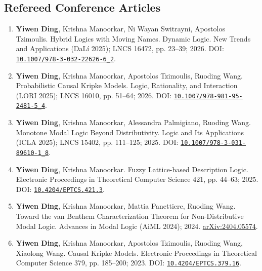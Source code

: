 \documentclass[11pt,a4paper]{article}
\begin{document}
\subsection*{Refereed Conference Articles}
\begin{enumerate}
\item \textbf{Yiwen Ding}, Krishna Manoorkar, Ni Wayan Switrayni, Apostolos Tzimoulis. Hybrid Logics with Moving Names. \textnormal{Dynamic Logic. New Trends and Applications (DaL\'{i} 2025); LNCS 16472, pp. 23--39; 2026}. DOI: \href{https://doi.org/10.1007/978-3-032-22626-6_2}{\nolinkurl{10.1007/978-3-032-22626-6_2}}.
\item \textbf{Yiwen Ding}, Krishna Manoorkar, Apostolos Tzimoulis, Ruoding Wang. Probabilistic Causal Kripke Models. \textnormal{Logic, Rationality, and Interaction (LORI 2025); LNCS 16010, pp. 51--64; 2026}. DOI: \href{https://doi.org/10.1007/978-981-95-2481-5_4}{\nolinkurl{10.1007/978-981-95-2481-5_4}}.
\item \textbf{Yiwen Ding}, Krishna Manoorkar, Alessandra Palmigiano, Ruoding Wang. Monotone Modal Logic Beyond Distributivity. \textnormal{Logic and Its Applications (ICLA 2025); LNCS 15402, pp. 111--125; 2025}. DOI: \href{https://doi.org/10.1007/978-3-031-89610-1_8}{\nolinkurl{10.1007/978-3-031-89610-1_8}}.
\item \textbf{Yiwen Ding}, Krishna Manoorkar. Fuzzy Lattice-based Description Logic. \textnormal{Electronic Proceedings in Theoretical Computer Science 421, pp. 44--63; 2025}. DOI: \href{https://doi.org/10.4204/EPTCS.421.3}{\nolinkurl{10.4204/EPTCS.421.3}}.
\item \textbf{Yiwen Ding}, Krishna Manoorkar, Mattia Panettiere, Ruoding Wang. Toward the van Benthem Characterization Theorem for Non-Distributive Modal Logic. \textnormal{Advances in Modal Logic (AiML 2024); 2024}. \href{https://arxiv.org/abs/2404.05574}{arXiv:2404.05574}.
\item \textbf{Yiwen Ding}, Krishna Manoorkar, Apostolos Tzimoulis, Ruoding Wang, Xiaolong Wang. Causal Kripke Models. \textnormal{Electronic Proceedings in Theoretical Computer Science 379, pp. 185--200; 2023}. DOI: \href{https://doi.org/10.4204/EPTCS.379.16}{\nolinkurl{10.4204/EPTCS.379.16}}.
\end{enumerate}
\end{document}
